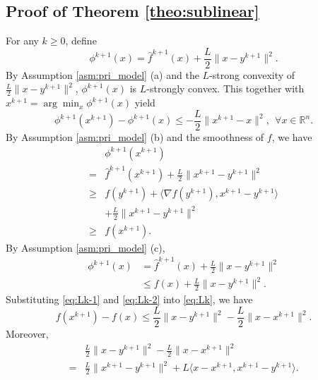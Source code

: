 \documentclass[letterpaper, 10 pt, conference]{ieeeconf}  %
\begin{document}
\begin{appendix}
\subsection{Proof of Theorem \ref{theo:sublinear}}\label{appe:theo1}
For any $k\ge 0$, define \[\phi^{k+1}(x) = \hat{f}^{k+1}(x) + \frac{L}{2}\|x-y^{k+1}\|^2.\] By Assumption \ref{asm:pri_model} (a) and the $L$-strong convexity of $\frac{L}{2}\|x-y^{k+1}\|^2$, $\phi^{k+1}(x)$ is $L$-strongly convex. This together with $x^{k+1} = \arg\min_x \phi^{k+1}(x)$ yield
\begin{equation}\label{eq:Lk}
    \phi^{k+1}(x^{k+1}) - \phi^{k+1}(x) \leq -\frac{L}{2}\|x^{k+1}-x\|^2, ~~\forall x \in \mathbb{R}^n.
\end{equation}
By Assumption \ref{asm:pri_model} (b) and the smoothness of $f$, we have
\begin{equation}\label{eq:Lk-1}
    \begin{split}
        &\phi^{k+1}(x^{k+1})\\ =& \hat{f}^{k+1}(x^{k+1}) + \frac{L}{2}\|x^{k+1}-y^{k+1}\|^2 \\
        \geq& f(y^{k+1})+\langle \nabla f(y^{k+1}),x^{k+1}-y^{k+1}\rangle \\ &+ \frac{L}{2}\|x^{k+1}-y^{k+1}\|^2 \\
        \geq& f(x^{k+1}).
    \end{split}
\end{equation}
By Assumption \ref{asm:pri_model} (c), 
\begin{equation}\label{eq:Lk-2}
    \begin{split}
        \phi^{k+1}(x) &= \hat{f}^{k+1}(x) + \frac{L}{2}\|x-y^{k+1}\|^2 \\
    &\leq f(x) + \frac{L}{2}\|x-y^{k+1}\|^2.
    \end{split}
\end{equation}
Substituting \eqref{eq:Lk-1} and \eqref{eq:Lk-2} into \eqref{eq:Lk}, we have
\begin{equation}\label{eq:A}
    f(x^{k+1})-f(x) \leq \frac{L}{2}\|x-y^{k+1}\|^2 - \frac{L}{2}\|x-x^{k+1}\|^2.
\end{equation}
Moreover,
\begin{equation*}
\begin{split}
    & \frac{L}{2}\|x-y^{k+1}\|^2 - \frac{L}{2}\|x-x^{k+1}\|^2\\
    =&\frac{L}{2}\|x^{k+1}-y^{k+1}\|^2+L\langle x-x^{k+1},x^{k+1}-y^{k+1} \rangle.
\end{split}
\end{equation*}

\end{appendix}
\end{document}
